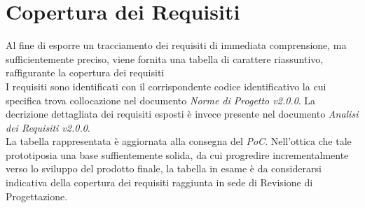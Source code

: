 \section{Copertura dei Requisiti} \label{Req}
Al fine di esporre un tracciamento dei requisiti di immediata comprensione, ma sufficientemente preciso, viene fornita una tabella di carattere riassuntivo, raffigurante la copertura dei requisiti\\ 
I requisiti sono identificati con il corrispondente codice identificativo la cui specifica trova collocazione nel documento \textit{Norme di Progetto v2.0.0}. La decrizione dettagliata dei requisiti esposti è invece presente nel documento \textit{Analisi dei Requisiti v2.0.0}.\\
La tabella rappresentata è aggiornata alla consegna del \textit{PoC}\glossario. Nell'ottica che tale prototipo\glossario sia una base suffientemente solida, da cui progredire incrementalmente verso lo sviluppo del prodotto finale, la tabella in esame è da considerarsi indicativa della copertura dei requisiti raggiunta in sede di Revisione di Progettazione.\\

